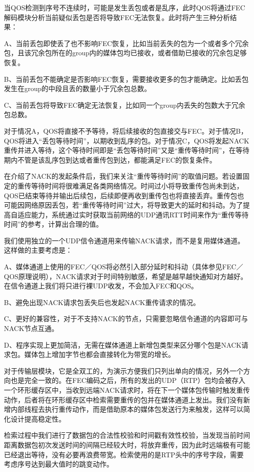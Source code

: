 \documentclass[onecolumn]{article}
\begin{document}
\begin{CJK*}{UTF8}{gbsn}
当QOS检测到序号不连续时，可能是发生丢包或者是乱序，此时QOS将通过FEC解码模块分析当前疑似丢包是否将导致FEC无法恢复。此时将产生三种分析结果：

A、当前丢包即使丢了也不影响FEC恢复，比如当前丢失的包为一个或者多个冗余包，且该冗余包所在的group内的媒体包均已接收，或者借助已接收的冗余包足够恢复。

B、当前丢包不能确定是否影响FEC恢复，需要接收更多的包才能确定。比如丢包发生在group的中段且丢的数量小于冗余包总数。

C、当前丢包将导致FEC确定无法恢复，比如同一个group内丢失的包数大于冗余包总数。

对于情况A，QOS将直接不予等待，将后续接收的包直接交与FEC。对于情况B，QOS将进入“丢包等待时间”，以期收到乱序的包。对于情况C，QOS将发起NACK重传并进入等待，这个等待时间即是“丢包等待时间”又是“重传等待时间”，在等待期内不管是该乱序包到达或者重传包到达，都能满足FEC的恢复条件。

在介绍了NACK的发起条件后，我们来关注“重传等待时间”的取值问题。若设置固定的重传等待时间将很难满足各类网络情况。时间过小将导致重传包尚未到达，QOS已结束等待并输出后续包，后续即便再收到重传包也将直接丢弃。重传包也可能因网络原因丢包，若“重传等待时间”过大，将导致更大的延时和抖动。为了提高自适应能力，系统通过实时获取当前网络的UDP通讯RTT时间来作为“重传等待时间”的参考，计算出合理的值。

我们使用独立的一个UDP信令通道用来传输NACK请求，而不是复用媒体通道。这样做的主要考虑是：

A、媒体通道上使用的FEC／QOS将必然引入部分延时和抖动（具体参见FEC／QOS原理说明），NACK请求对于时间特别敏感，希望是越早越快通知对方越好。在信令通道上我们将只进行裸UDP收发，不会加入FEC和QOS。

B、避免出现NACK请求包丢失后也发起NACK重传请求的情况。

C、更好的兼容性，对于不支持NACK的节点，只需要忽略信令通道的内容即可与NACK节点互通。

D、程序实现上更加简洁，无需在媒体通道上新增包类型来区分哪个包是NACK请求包。媒体包上增加字节也都会直接转化为带宽的增长。

对于传输层模块，它是全双工的，为演示方便我们只列出单向的情况，另外一个方向也是完全一致的。在FEC编码之后，所有的发出的UDP（RTP）包均会被存入一个环形缓存区中，当收到远端NACK请求时，将在下一个媒体包传输时触发重传动作，后者将在环形缓存区中检索需要重传的包并在媒体通道上发出。我们没有新增内部线程去执行重传动作，而是借助原本的媒体包发送行为来触发，这样可以简化设计提高稳定性。

检索过程中我们进行了数据包的合法性校验和时间戳有效性校验，当发现当前时间距离数据包初次发送时间的间隔已经较大时，将放弃重传，因为此时远端极有可能已经退出等待，没有必要再浪费带宽。检索使用的是RTP头中的序号字段，需要考虑序号达到最大值时的跳变动作。


\end{CJK*}
\end{document}

